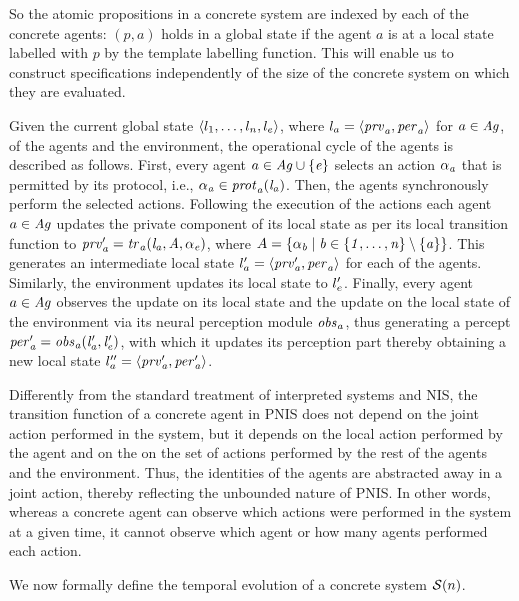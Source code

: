 So the atomic propositions in a concrete system are indexed by each of the
concrete agents: $(p, a)$ holds in a global state if the agent $a$ is at a local
state labelled with $p$ by the template labelling function. This will enable us
to construct specifications independently of the size of the concrete system on
which they are evaluated.

Given the current global state $\left \langle l_{1}, \ldots, l_{n}, l_{e} \right \rangle$, where $l_{a} = \left \langle \it{prv}_{a}, \it{per}_{a} \right \rangle$ for $a \in \it{Ag}$, of the
agents and the environment, the operational cycle of the agents is described as
follows. First, every agent ${a} \in \it{Ag} \cup \left \{ {e} \right \}$ selects an
action $\it{\alpha}_{a}$ that is permitted by its protocol, i.e., $\it{\alpha}_{a} \in \it{prot}_{a}(l_{a})$. Then, the agents synchronously perform the selected actions.
Following  the execution of the actions each agent ${a} \in \it{Ag}$ updates
the private component of its local state as per its local transition function to
$\it{prv}'_{a} = \it{tr}_{a} ( l_{a}, A, \it{\alpha}_{e})$, where $A = \left \{  \it{\alpha}_{b} \mid b \in
\left \{ 1, \ldots, n \right \} \setminus \left \{ a \right \} \right \}$.  This generates an intermediate local
state $l'_{a} = \left \langle \it{prv}'_{a}, \it{per}_{a} \right \rangle$ for each of the agents. Similarly,
the  environment updates its local state to $l'_{e}$. Finally, every agent
${a} \in \it{Ag}$ observes the update on its local state and the update on the
local state of the environment via its neural perception module $\it{obs}_{a}$, thus
generating a percept $\it{per}'_{a} = \it{obs}_{a}(l'_{a}, l'_{e})$, with which it
updates its perception part thereby obtaining a new local state $l''_{a} =
\left \langle  \it{prv}'_{a}, \it{per}'_{a} \right \rangle$.


Differently from the standard treatment of interpreted systems and NIS, the
transition function of a concrete agent in PNIS  does not depend on the joint
action performed in the system, but it depends on the local action performed by
the  agent and on the on the set of actions performed by the rest of the agents
and the environment.  Thus, the identities of the agents are abstracted away in
a joint action, thereby reflecting the unbounded nature of PNIS. In other words,
whereas  a concrete agent can observe which actions were performed in the system
at a given time,  it cannot observe which agent or how many agents performed
each action.

We now formally define the temporal evolution of a concrete system
$\mathcal{S}(n)$.



